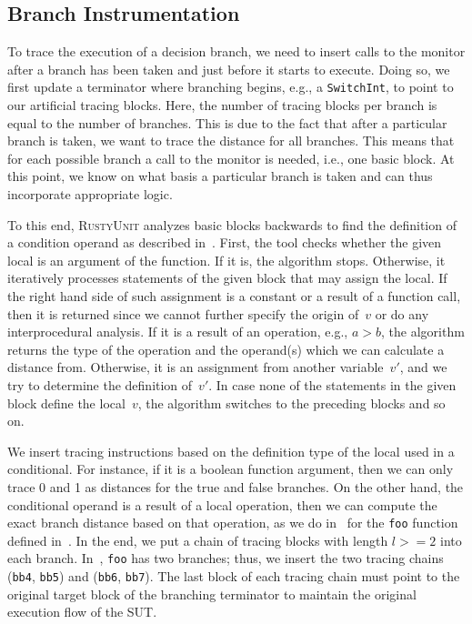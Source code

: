 \documentclass[paper=a4,%
  twoside,%
  BCOR4mm,%
  abstract=true,%
  toc=bibliography,%
  chapterprefix=true,%
  toc=bibliographynumbered,%
  open=right,%
  english,%
  pagesize=pdftex]{scrreprt}
\newcommand{\tech}{\textsc{RustyUnit}\xspace}
\newcommand{\sut}{\ac{SUT}\xspace}
\begin{document}
\subsection{Branch Instrumentation}
To trace the execution of a decision branch, we need to insert calls to the monitor after a branch has been taken and just before it starts to execute. Doing so, we first update a terminator where branching begins, e.g., a \texttt{SwitchInt}, to point to our artificial tracing blocks. Here, the number of tracing blocks per branch is equal to the number of branches. This is due to the fact that after a particular branch is taken, we want to trace the distance for all branches. This means that for each possible branch a call to the monitor is needed, i.e., one basic block. At this point, we know on what basis a particular branch is taken and can thus incorporate appropriate logic.

To this end, \tech analyzes basic blocks backwards to find the definition of a condition operand as described in~. First, the tool checks whether the given local is an argument of the function. If it is, the algorithm stops. Otherwise, it iteratively processes statements of the given block that may assign the local. If the right hand side of such assignment is a constant or a result of a function call, then it is returned since we cannot further specify the origin of~$v$ or do any interprocedural analysis. If it is a result of an operation, e.g., $a > b$, the algorithm returns the type of the operation and the operand(s) which we can calculate a distance from. Otherwise, it is an assignment from another variable~$v'$, and we try to determine the definition of~$v'$. In case none of the statements in the given block define the local~$v$, the algorithm switches to the preceding blocks and so on.

We insert tracing instructions based on the definition type of the local used in a conditional. For instance, if it is a boolean function argument, then we can only trace 0 and 1 as distances for the true and false branches. On the other hand, the conditional operand is a result of a local operation, then we can compute the exact branch distance based on that operation, as we do in~ for the \texttt{foo} function defined in~. In the end, we put a chain of tracing blocks with length $l >= 2$ into each branch. In~, \texttt{foo} has two branches; thus, we insert the two tracing chains (\texttt{bb4}, \texttt{bb5}) and (\texttt{bb6}, \texttt{bb7}). The last block of each tracing chain must point to the original target block of the branching terminator to maintain the original execution flow of the \sut.
\end{document}

